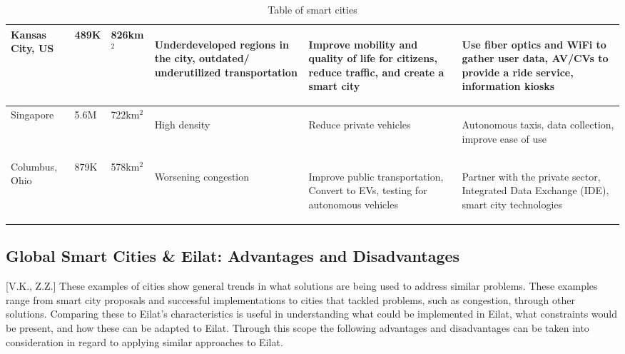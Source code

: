 \documentclass[12pt]{article}                       %
\begin{document}
\begin{table}[H]
\begin{tabular}{ m{1.7cm} | m{1.1cm} | m{1.3cm} | m{3.4cm} | m{3.4cm} | m{3.4cm} }
        Kansas City, US &
        489K &
        826km$^2$ &
        \begin{flushleft}Underdeveloped regions in the city, outdated/ underutilized transportation\end{flushleft} &
        \begin{flushleft}Improve mobility and quality of life for citizens, reduce traffic, and create a smart city\end{flushleft} &
        \begin{flushleft}Use fiber optics and WiFi to gather user data, AV/CVs to provide a ride service, information kiosks \end{flushleft} \\
        \hline{}
        
        Singapore &
        5.6M &
        722km$^2$ &
        \begin{flushleft}High density \end{flushleft} &
        \begin{flushleft}Reduce private vehicles \end{flushleft} &
        \begin{flushleft}Autonomous taxis, data collection, improve ease of use\end{flushleft} \\
        \hline{}
        
        Columbus, Ohio &
        879K &
        578km$^2$ &
        \begin{flushleft}Worsening congestion\end{flushleft} &
        \begin{flushleft}Improve public transportation, Convert to EVs, testing for autonomous vehicles\end{flushleft} &
        \begin{flushleft}Partner with the private sector, Integrated Data Exchange (IDE), smart city technologies\end{flushleft}
    \end{tabular}
    \caption{Table of smart cities}
    \label{tab:smart_cities}
\end{table}

\subsection{Global Smart Cities \& Eilat: Advantages and Disadvantages}[V.K., Z.Z.]
These examples of cities show general trends in what solutions are being used to address similar problems. These examples range from smart city proposals and successful implementations to cities that tackled problems, such as congestion, through other solutions. Comparing these to Eilat's characteristics is useful in understanding what could be implemented in Eilat, what constraints would be present, and how these can be adapted to Eilat. Through this scope the following advantages and disadvantages can be taken into consideration in regard to applying similar approaches to Eilat. 
\end{document}
